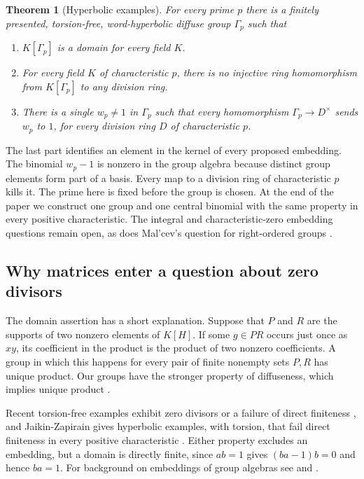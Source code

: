 \documentclass[11pt,a4paper]{article}
\newtheorem{maintheorem}{Theorem}
\numberwithin{equation}{section}
\begin{document}
\begin{maintheorem}[Hyperbolic examples]\label{thm:A}
For every prime \(p\) there is a finitely presented, torsion-free, word-hyperbolic diffuse group \(\Gamma_p\) such that
\begin{enumerate}
\item \(K[\Gamma_p]\) is a domain for every field \(K\).
\item For every field \(K\) of characteristic \(p\), there is no injective ring homomorphism from \(K[\Gamma_p]\) to any division ring.
\item There is a single \(w_p\ne1\) in \(\Gamma_p\) such that every homomorphism \(\Gamma_p\to D^\times\) sends \(w_p\) to \(1\), for every division ring \(D\) of characteristic \(p\).
\end{enumerate}
\end{maintheorem}

The last part identifies an element in the kernel of every proposed embedding. The binomial \(w_p-1\) is nonzero in the group algebra because distinct group elements form part of a basis. Every map to a division ring of characteristic \(p\) kills it. The prime here is fixed before the group is chosen. At the end of the paper we construct one group and one central binomial with the same property in every positive characteristic. The integral and characteristic-zero embedding questions remain open, as does Mal'cev's question for right-ordered groups \cite[Problem~1.6]{r16}.

\subsection*{Why matrices enter a question about zero divisors}
The domain assertion has a short explanation. Suppose that \(P\) and \(R\) are the supports of two nonzero elements of \(K[H]\). If some \(g\in PR\) occurs just once as \(xy\), its coefficient in the product is the product of two nonzero coefficients. A group in which this happens for every pair of finite nonempty sets \(P,R\) has unique product. Our groups have the stronger property of diffuseness, which implies unique product \cite[Proposition~1.1]{r6}.

Recent torsion-free examples exhibit zero divisors \cite{r12,r17,r21} or a failure of direct finiteness \cite{r22}, and Jaikin-Zapirain gives hyperbolic examples, with torsion, that fail direct finiteness in every positive characteristic \cite{r13}. Either property excludes an embedding, but a domain is directly finite, since \(ab=1\) gives \((ba-1)b=0\) and hence \(ba=1\). For background on embeddings of group algebras see \cite{r1,r11} and \cite[Section~3.2]{r10}.
\end{document}
